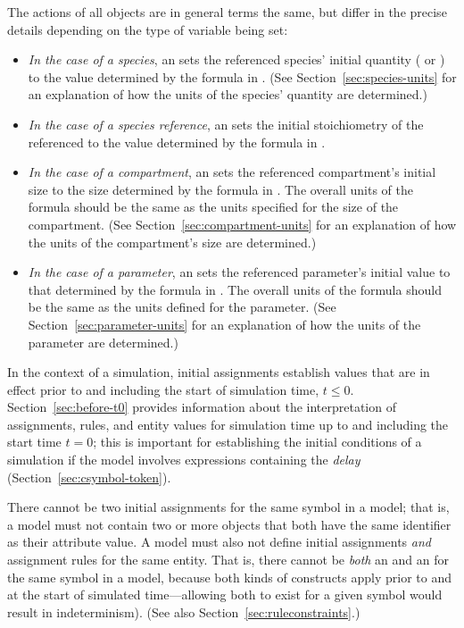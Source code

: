 The actions of all \InitialAssignment objects are in general terms
the same, but differ in the precise details depending on the type
of variable being set:
\begin{itemize}

\item \emph{In the case of a species}, an \InitialAssignment sets
  the referenced species' initial quantity
  ( or ) to
  the value determined by the formula in .  (See
  Section~\ref{sec:species-units} for an explanation of how the
  units of the species' quantity are determined.)

\item \emph{In the case of a species reference}, an \InitialAssignment
  sets the initial stoichiometry of the referenced \SpeciesReference 
  to the value determined by the formula in .  

\item \emph{In the case of a compartment}, an \InitialAssignment
  sets the referenced compartment's initial size to the size
  determined by the formula in .  The overall units of
  the formula should be the same as the units specified for the size of the
  compartment.  (See Section~\ref{sec:compartment-units} for an
  explanation of how the units of the compartment's size are
  determined.)

\item \emph{In the case of a parameter}, an \InitialAssignment
  sets the referenced parameter's initial value to that determined
  by the formula in .  The overall units of the
  formula should be the same as the units defined for the parameter.  (See
  Section~\ref{sec:parameter-units} for an explanation of how the
  units of the parameter are determined.)

\end{itemize}

In the context of a simulation, initial assignments establish
values that are in effect prior to and including the start of
simulation time, \ie $t \leq 0$.  Section~\ref{sec:before-t0}
provides information about the interpretation of assignments,
rules, and entity values for simulation time up to and including
the start time $t = 0$; this is important for establishing the
initial conditions of a simulation if the model involves
expressions containing the \emph{delay} 
(Section~\ref{sec:csymbol-token}).

There cannot be two initial assignments for the same symbol in a
model; that is, a model must not contain two or more
\InitialAssignment objects that both have the same identifier as
their  attribute value.  A model must also not define
initial assignments \emph{and} assignment rules for the same
entity.  That is, there cannot be \emph{both} an
\InitialAssignment and an \AssignmentRule for the same symbol in a
model, because both kinds of constructs apply prior to and at the
start of simulated time---allowing both to exist for a given
symbol would result in indeterminism).  (See also
Section~\ref{sec:ruleconstraints}.)

